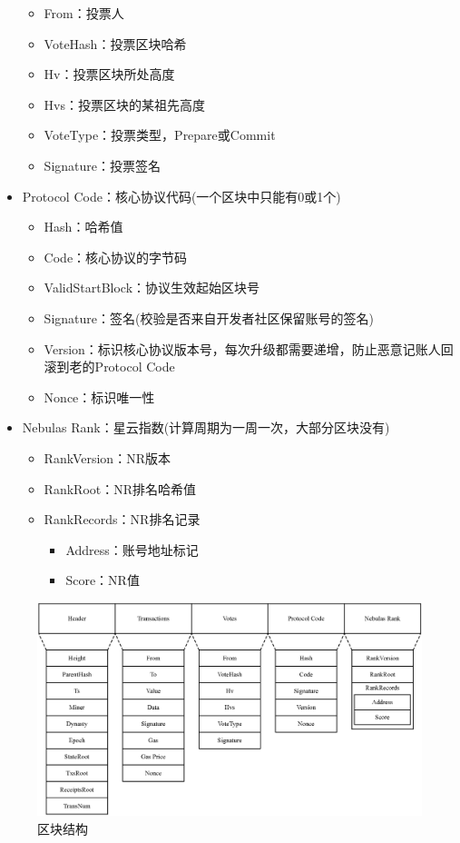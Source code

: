 \begin{itemize}
\begin{itemize}
		\item From：投票人
		\item VoteHash：投票区块哈希
		\item Hv：投票区块所处高度
		\item Hvs：投票区块的某祖先高度
		\item VoteType：投票类型，Prepare或Commit
		\item Signature：投票签名
		\end{itemize}
	\item Protocol Code：核心协议代码(一个区块中只能有0或1个)
		\begin{itemize}
		\item Hash：哈希值
		\item Code：核心协议的字节码
		\item ValidStartBlock：协议生效起始区块号
		\item Signature：签名(校验是否来自开发者社区保留账号的签名)
		\item Version：标识核心协议版本号，每次升级都需要递增，防止恶意记账人回滚到老的Protocol Code
		\item Nonce：标识唯一性
		\end{itemize}
	\item Nebulas Rank：星云指数(计算周期为一周一次，大部分区块没有)
		\begin{itemize}
		\item RankVersion：NR版本
		\item RankRoot：NR排名哈希值
		\item RankRecords：NR排名记录
			\begin{itemize}
				\item Address：账号地址标记
				\item Score：NR值
			\end{itemize}
		\end{itemize}
\end{itemize}

\begin{figure}[h]
\centering
\includegraphics[width=13.8cm]{./figs/block}
\caption{区块结构}
\label{fig:block}
\end{figure}


